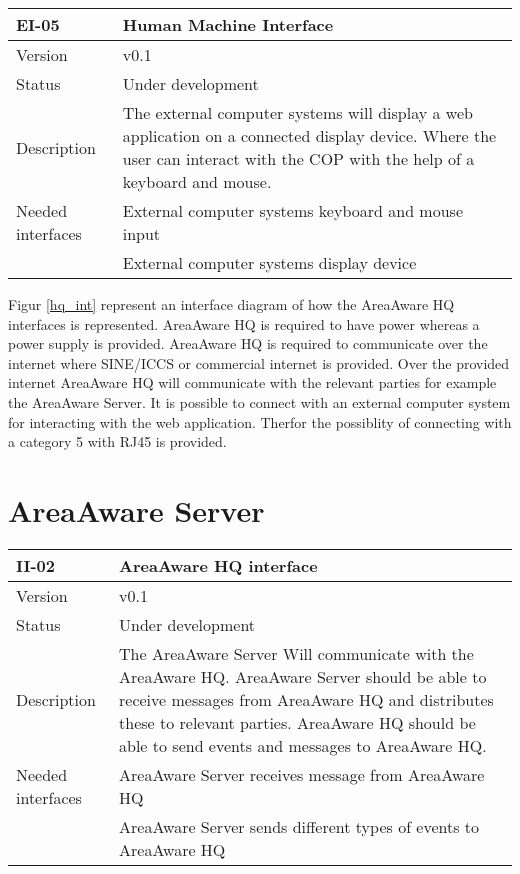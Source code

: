 \begin{longtable}{| p{3.5cm} |  p{10cm} | }
	\hline
	\textbf{EI-05} &  \textbf{Human Machine Interface} \\
	\hline
	Version & v0.1 \\
	\hline
	Status & Under development \\
	\hline
	Description & The external computer systems will display a web application on a connected display device. Where the user can interact with the COP with the help of a keyboard and mouse.
	\\
	\hline
	Needed interfaces 
	& External computer systems keyboard and mouse input \\
	& External computer systems display device \\ 
	\hline
\end{longtable}
\clearpage
{} 

Figur \ref{hq_int} represent an interface diagram of how the AreaAware HQ interfaces is represented. AreaAware HQ is required to have power whereas a power supply is provided. AreaAware HQ is required to communicate over the internet where SINE/ICCS or commercial internet is provided. Over the provided internet AreaAware HQ will communicate with the relevant parties for example the AreaAware Server. It is possible to connect with an external computer system for interacting with the web application. Therfor the possiblity of connecting with a category 5 with RJ45 is provided. 


\newpage

\section{AreaAware Server}
\label{sec:areaAwareserver}
\begin{longtable}{| p{3.5cm} |  p{10cm} | }
	\hline
	\textbf{II-02} &  \textbf{AreaAware HQ interface } \\
	\hline
	Version & v0.1 \\
	\hline
	Status & Under development \\
	\hline
	Description & The AreaAware Server Will communicate with the AreaAware HQ. AreaAware Server should be able to receive messages from AreaAware HQ and distributes these to relevant parties.  AreaAware HQ should be able to send events and messages to AreaAware HQ.
	\\
	\hline
	Needed interfaces & AreaAware Server receives message from AreaAware HQ \\
	& AreaAware Server sends different types of events to AreaAware HQ \\
	\hline
\end{longtable}

